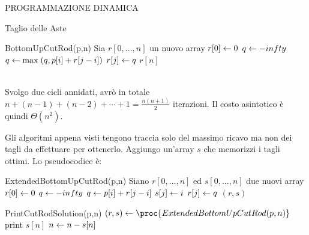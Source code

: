 \documentclass[8pt]{extarticle}
\begin{document}
\begin{formulario}
\begin{myParagraph}{PROGRAMMAZIONE DINAMICA}
\begin{subParagraph}{Taglio delle Aste}
\begin{itemize}
\begin{Descr}
				\end{Descr}
				\begin{code}{BottomUpCutRod(p,n)}
\li Sia $r[0,...,n]$ un nuovo array
\li $r[0] \leftarrow 0$
\li {}
	\li $q \leftarrow -infty$
	\li {}
		\li $q \leftarrow \max\;(q, p[i]+r[j-i])$
	\END
	\li $r[j] \leftarrow q$
\END
\li \RETURN $r[n]$
				\end{code}
				\\
Svolgo due cicli annidati, avrò in totale $n+(n-1)+(n-2)+\cdots+1=\frac{n(n+1)}{2}$ iterazioni. Il costo asintotico è quindi $\Theta(n^2)$.
			\end{itemize}
Gli algoritmi appena visti tengono traccia solo del massimo ricavo ma non dei tagli da effettuare per ottenerlo. Aggiungo un'array $s$ che memorizzi i tagli ottimi. Lo pseudocodice è:
			\begin{code}{ExtendedBottomUpCutRod(p,n)}
\li Siano $r[0,...,n]$ ed $s[0,...,n]$ due nuovi array
\li $r[0] \leftarrow 0$
\li {}
	\li $q \leftarrow -infty$
	\li {}
		\li {}
			\li $q \leftarrow p[i]+r[j-i]$
			\li $s[j] \leftarrow i$
		\END
	\END
	\li $r[j] \leftarrow q$
\END
\li \RETURN $(r,s)$
			\end{code}
			\begin{code}{PrintCutRodSolution(p,n)}
\li $(r,s) \get \proc{ExtendedBottomUpCutRod(p,n)}$
\li {}
	\li print $s[n]$
	\li $n \leftarrow n-s[n]$
\END
			\end{code}
		\end{subParagraph}
	

\end{myParagraph}
\end{formulario}
\end{document}

